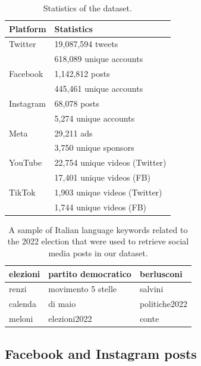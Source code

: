 \documentclass[sigconf,screen]{acmart}
\begin{document}
\begin{table}[!t]
\centering
\small
\begin{tabular}{ll}
\hline
\textbf{Platform} & \textbf{Statistics} \\
\hline
Twitter & 19,087,594 tweets \\  
 & 618,089 unique accounts \\

\hline
Facebook & 1,142,812 posts \\
& 445,461 unique accounts \\
\hline
Instagram & 68,078 posts \\
&5,274 unique accounts \\
\hline
Meta & 29,211 ads \\
& 3,750 unique sponsors \\
\hline
YouTube & 22,754 unique videos (Twitter) \\
 & 17,401 unique videos (FB) \\
 \hline
TikTok & 1,903 unique videos (Twitter) \\
 & 1,744 unique videos (FB) \\
\hline
\end{tabular}
\caption{Statistics of the dataset.}
\label{tab:statistics}
\end{table}



\begin{table}[!t]
\centering
\small
\begin{tabular}{lll}
elezioni & partito democratico & berlusconi \\ \hline
renzi & movimento 5 stelle & salvini \\ \hline
calenda & di maio & politiche2022 \\ \hline
meloni & elezioni2022 & conte  \\ \hline
\end{tabular}
\caption{A sample of Italian language keywords related to the 2022 election that were used to retrieve social media posts in our dataset.}
\label{tab:keywords}
\end{table}

\subsection{Facebook and Instagram posts}
\end{document}
